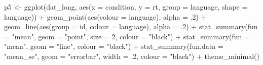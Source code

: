 \documentclass[
  english,
  doc,floatsintext]{apa6}
\newenvironment{Shaded}{\begin{snugshade}}{\end{snugshade}}
\newcommand{\AttributeTok}[1]{\textcolor[rgb]{0.77,0.63,0.00}{#1}}
\newcommand{\DecValTok}[1]{\textcolor[rgb]{0.00,0.00,0.81}{#1}}
\newcommand{\FunctionTok}[1]{\textcolor[rgb]{0.00,0.00,0.00}{#1}}
\newcommand{\NormalTok}[1]{#1}
\newcommand{\OtherTok}[1]{\textcolor[rgb]{0.56,0.35,0.01}{#1}}
\newcommand{\SpecialCharTok}[1]{\textcolor[rgb]{0.00,0.00,0.00}{#1}}
\newcommand{\StringTok}[1]{\textcolor[rgb]{0.31,0.60,0.02}{#1}}
\begin{document}
\begin{Shaded}
\begin{Highlighting}[]
\NormalTok{p5 }\OtherTok{\textless{}{-}} \FunctionTok{ggplot}\NormalTok{(dat\_long, }\FunctionTok{aes}\NormalTok{(}\AttributeTok{x =}\NormalTok{ condition, }\AttributeTok{y =}\NormalTok{ rt, }
                           \AttributeTok{group =}\NormalTok{ language, }
                           \AttributeTok{shape =}\NormalTok{ language)) }\SpecialCharTok{+}
  \FunctionTok{geom\_point}\NormalTok{(}\FunctionTok{aes}\NormalTok{(}\AttributeTok{colour =}\NormalTok{ language),}
             \AttributeTok{alpha =}\NormalTok{ .}\DecValTok{2}\NormalTok{) }\SpecialCharTok{+}
  \FunctionTok{geom\_line}\NormalTok{(}\FunctionTok{aes}\NormalTok{(}\AttributeTok{group =}\NormalTok{ id, }\AttributeTok{colour =}\NormalTok{ language), }
            \AttributeTok{alpha =}\NormalTok{ .}\DecValTok{2}\NormalTok{) }\SpecialCharTok{+}
  \FunctionTok{stat\_summary}\NormalTok{(}\AttributeTok{fun =} \StringTok{"mean"}\NormalTok{, }
               \AttributeTok{geom =} \StringTok{"point"}\NormalTok{, }
               \AttributeTok{size =} \DecValTok{2}\NormalTok{, }
               \AttributeTok{colour =} \StringTok{"black"}\NormalTok{) }\SpecialCharTok{+}
  \FunctionTok{stat\_summary}\NormalTok{(}\AttributeTok{fun =} \StringTok{"mean"}\NormalTok{, }
               \AttributeTok{geom =} \StringTok{"line"}\NormalTok{, }
               \AttributeTok{colour =} \StringTok{"black"}\NormalTok{) }\SpecialCharTok{+}
  \FunctionTok{stat\_summary}\NormalTok{(}\AttributeTok{fun.data =} \StringTok{"mean\_se"}\NormalTok{, }
               \AttributeTok{geom =} \StringTok{"errorbar"}\NormalTok{, }
               \AttributeTok{width =}\NormalTok{ .}\DecValTok{2}\NormalTok{, }
               \AttributeTok{colour =} \StringTok{"black"}\NormalTok{) }\SpecialCharTok{+}
  \FunctionTok{theme\_minimal}\NormalTok{()}


\end{Highlighting}
\end{Shaded}
\end{document}
